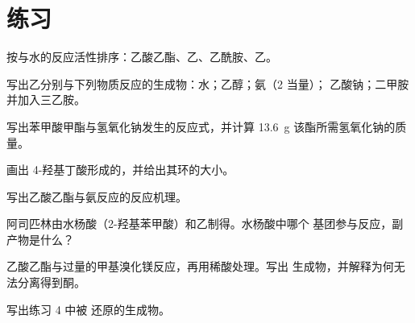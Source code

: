 \section{练习}

\begin{exercise}[$\star$]\label{exo:b2:acyl-substitution:1}
按与水的反应活性排序：乙酸乙酯、乙、乙酰胺、乙。
\end{exercise}

\begin{exercise}[$\star$]\label{exo:b2:acyl-substitution:2}
写出乙分别与下列物质反应的生成物：水；乙醇；氨（2 当量）；
乙酸钠；二甲胺并加入三乙胺。
\end{exercise}

\begin{exercise}[$\star$]\label{exo:b2:acyl-substitution:3}
写出苯甲酸甲酯与氢氧化钠发生的反应式，并计算
\qty{13.6}{g} 该酯所需氢氧化钠的质量。
\end{exercise}

\begin{exercise}[$\star$]\label{exo:b2:acyl-substitution:4}
画出 4-羟基丁酸形成的，并给出其环的大小。
\end{exercise}

\begin{exercise}[$\star\star$]\label{exo:b2:acyl-substitution:5}
写出乙酸乙酯与氨反应的反应机理。
\end{exercise}

\begin{exercise}[$\star\star$]\label{exo:b2:acyl-substitution:6}
阿司匹林由水杨酸（2-羟基苯甲酸）和乙制得。水杨酸中哪个
基团参与反应，副产物是什么？
\end{exercise}

\begin{exercise}[$\star\star$]\label{exo:b2:acyl-substitution:7}
乙酸乙酯与过量的甲基溴化镁反应，再用稀酸处理。写出
生成物，并解释为何无法分离得到酮。
\end{exercise}

\begin{exercise}[$\star\star$]\label{exo:b2:acyl-substitution:8}
写出练习 4 中被  还原的生成物。
\end{exercise}

